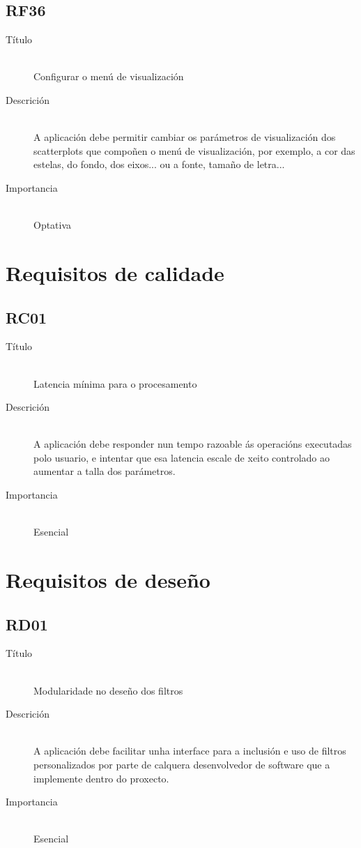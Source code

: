 \subsection*{RF36}
\begin{description}
\item[Título] \hfill \\
Configurar o menú de visualización
\item[Descrición] \hfill \\
A aplicación debe permitir cambiar os parámetros de visualización dos scatterplots que compoñen o menú de visualización, por exemplo, a cor das estelas, do fondo, dos eixos... ou a fonte, tamaño de letra...
\item[Importancia] \hfill \\
Optativa
\end{description}

\section{Requisitos de calidade}

\subsection*{RC01}
\begin{description}
\item[Título] \hfill \\
Latencia mínima para o procesamento
\item[Descrición] \hfill \\
A aplicación debe responder nun tempo razoable ás operacións executadas polo usuario, e intentar que esa latencia escale de xeito controlado ao aumentar a talla dos parámetros.
\item[Importancia] \hfill \\
Esencial
\end{description}

\section{Requisitos de deseño}

\subsection*{RD01}
\begin{description}
\item[Título] \hfill \\
Modularidade no deseño dos filtros
\item[Descrición] \hfill \\
A aplicación debe facilitar unha interface para a inclusión e uso de filtros personalizados por parte de calquera desenvolvedor de software que a implemente dentro do proxecto.
\item[Importancia] \hfill \\
Esencial
\end{description}

